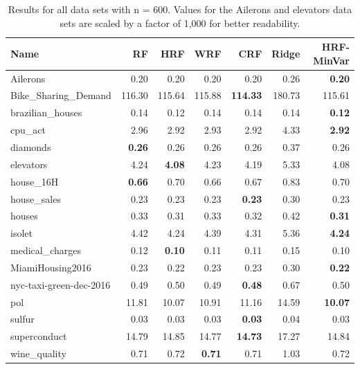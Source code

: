 \begin{table}[ht]
\centering
\begingroup\scriptsize
\begin{tabular}{lrrrrrr}
  \hline
\textbf{ Name } & \textbf{ RF } & \textbf{ HRF } & \textbf{ WRF } & \textbf{ CRF } & \textbf{ Ridge } & \textbf{ HRF-MinVar } \\ 
  \hline
Ailerons & 0.20 & 0.20 & 0.20 & 0.20 & 0.26 & \textbf{0.20} \\ 
  Bike\_Sharing\_Demand & 116.30 & 115.64 & 115.88 & \textbf{114.33} & 180.73 & 115.61 \\ 
  brazilian\_houses & 0.14 & 0.12 & 0.14 & 0.14 & 0.14 & \textbf{0.12} \\ 
  cpu\_act & 2.96 & 2.92 & 2.93 & 2.92 & 4.33 & \textbf{2.92} \\ 
  diamonds & \textbf{0.26} & 0.26 & 0.26 & 0.26 & 0.37 & 0.26 \\ 
  elevators & 4.24 & \textbf{4.08} & 4.23 & 4.19 & 5.33 & 4.08 \\ 
  house\_16H & \textbf{0.66} & 0.70 & 0.66 & 0.67 & 0.83 & 0.70 \\ 
  house\_sales & 0.23 & 0.23 & 0.23 & \textbf{0.23} & 0.30 & 0.23 \\ 
  houses & 0.33 & 0.31 & 0.33 & 0.32 & 0.42 & \textbf{0.31} \\ 
  isolet & 4.42 & 4.24 & 4.39 & 4.31 & 5.36 & \textbf{4.24} \\ 
  medical\_charges & 0.12 & \textbf{0.10} & 0.11 & 0.11 & 0.15 & 0.10 \\ 
  MiamiHousing2016 & 0.23 & 0.22 & 0.23 & 0.23 & 0.30 & \textbf{0.22} \\ 
  nyc-taxi-green-dec-2016 & 0.49 & 0.50 & 0.49 & \textbf{0.48} & 0.67 & 0.50 \\ 
  pol & 11.81 & 10.07 & 10.91 & 11.16 & 14.59 & \textbf{10.07} \\ 
  sulfur & 0.03 & 0.03 & 0.03 & \textbf{0.03} & 0.04 & 0.03 \\ 
  superconduct & 14.79 & 14.85 & 14.77 & \textbf{14.73} & 17.27 & 14.84 \\ 
  wine\_quality & 0.71 & 0.72 & \textbf{0.71} & 0.71 & 1.03 & 0.72 \\ 
   \hline
\end{tabular}
\endgroup
\caption{Results for all data sets with n = 600. Values for the Ailerons and elevators data sets are scaled by a factor of 1,000 for better readability.} 
\end{table}
